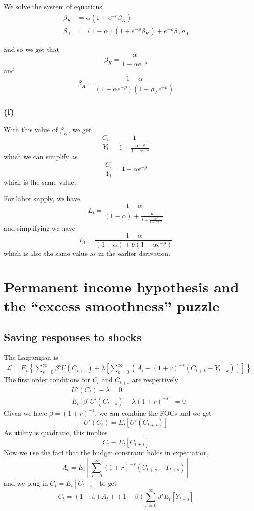 \documentclass[11pt]{amsart}
\begin{document}
We solve the system of equations
\begin{align*}
\beta_K &= \alpha (1+ e^{-\rho} \beta_K) \\
\beta_A &= (1-\alpha) (1+ e^{-\rho} \beta_K) + e^{-\rho} \beta_A \rho_A
\end{align*}

and so we get that
\[
\beta_K = \frac{\alpha}{1-\alpha e^{-\rho}}
\]
and
\[
\beta_A = \frac{1-\alpha}{(1-\alpha e^{-\rho})(1-\rho_A e^{-\rho})}
\]

\subsubsection*{(f)}

With this value of $\beta_K$, we get
\[
\frac{C_t}{Y_t} = \frac{1}{1 + \frac{\alpha e^{-\rho}}{1-\alpha e^{-\rho}}}
\]
which we can simplify as
\[
\frac{C_t}{Y_t} = 1-\alpha e^{-\rho}
\]
which is the same value.

For labor supply, we have
\[
L_t = \frac{1-\alpha}{(1-\alpha) + \frac{b}{1+ \frac{\alpha e^{-\rho}}{1-\alpha e^{-\rho}}}}
\]
and simplifying we have
\[
L_t = \frac{1-\alpha}{(1-\alpha) + b (1-\alpha e^{-\rho})}
\]
which is also the same value as in the earlier derivation.

\section{Permanent income hypothesis and the ``excess smoothness'' puzzle}

\subsection{Saving responses to shocks}
The Lagrangian is
\begin{align*}
	\mathcal{L} = E_t \left\lbrace \sum_{s=0}^\infty \beta^s U(C_{t+s}) + \lambda \left[ \sum_{k=0}^\infty \left( A_t - (1+r)^{-s} (C_{t+k} - Y_{t+k} ) \right) \right]\right\rbrace
\end{align*}
The first order conditions for $C_t$ and $C_{t+s}$ are respectively
\begin{align*}
	&U'(C_t) - \lambda = 0 \\
	&E_t \left[ \beta^s U'(C_{t+s}) -\lambda (1+r)^{-s} \right] = 0
\end{align*}
Given we have $\beta = (1+r)^{-1}$, we can combine the FOCs and we get
\[
U'(C_t) = E_t \left[ U'(C_{t+s}) \right]
\]
As utility is quadratic, this implies
\[
C_t = E_t \left[ C_{t+s} \right]
\]
Now we use the fact that the budget constraint holds in expectation,
\[
A_t = E_t \left[ \sum_{s=0}^\infty (1+r)^{-s} (C_{t+s} - T_{t+s}) \right]
\]
and we plug in $C_t = E_t \left[ C_{t+s} \right]$ to get
\[
C_t = (1-\beta) A_t + (1-\beta) \sum_{s=0}^\infty \beta^s E_t [Y_{t+s}]
\]
\end{document}
